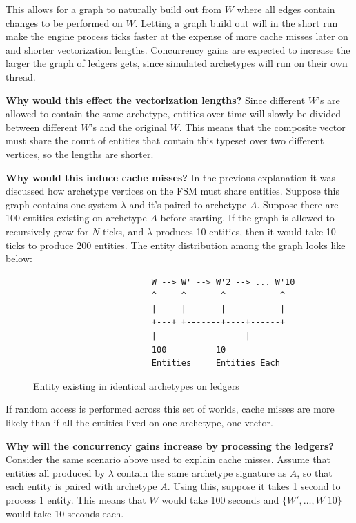 This allows for a graph to naturally build out from $W$ where all edges contain changes to be performed on $W$. Letting a graph build out will in the short run make the engine process ticks faster at the expense of more cache misses later on and shorter vectorization lengths. Concurrency gains are expected to increase the larger the graph of ledgers gets, since simulated archetypes will run on their own thread.

\textbf{Why would this effect the vectorization lengths?} Since different $W$'s are allowed to contain the same archetype, entities over time will slowly be divided between different $W$'s and the original $W$. This means that the composite vector must share the count of entities that contain this typeset over two different vertices, so the lengths are shorter. 

\textbf{Why would this induce cache misses?} In the previous explanation it was discussed how archetype vertices on the FSM must share entities. Suppose this graph contains one system $\lambda$ and it's paired to archetype $A$. Suppose there are 100 entities existing on archetype $A$ before starting. If the graph is allowed to recursively grow for $N$ ticks, and $\lambda$ produces 10 entities, then it would take 10 ticks to produce 200 entities. The entity distribution among the graph looks like below:


\begin{figure}[htbp]
    \centering
    \begin{verbatim}
                        W --> W' --> W'2 --> ... W'10
                        ^     ^       ^           ^  
                        |     |       |           |
                        +---+ +-------+----+------+  
                        |                  |         
                        100          10               
                        Entities     Entities Each    
    \end{verbatim}
    \caption{Entity existing in identical archetypes on ledgers}
\end{figure}

If random access is performed across this set of worlds, cache misses are more likely than if all the entities lived on one archetype, one vector.

\textbf{Why will the concurrency gains increase by processing the ledgers?} Consider the same scenario above used to explain cache misses. Assume that entities all produced by $\lambda$ contain the same archetype signature as $A$, so that each entity is paired with archetype $A$. Using this, suppose it takes 1 second to process 1 entity. This means that $W$ would take 100 seconds and $\{W',\ldots,W^\prime 10\}$ would take 10 seconds each. 

